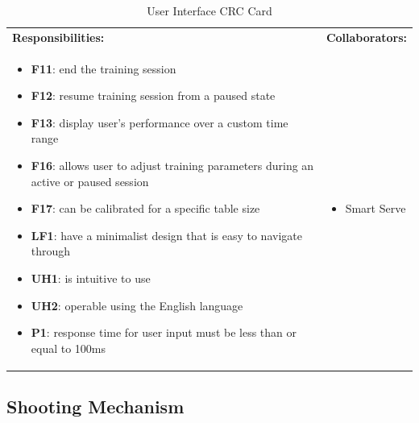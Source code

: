 \documentclass[11pt]{article}
\begin{document}
\begin{table}[H]
\centering
\label{my-label}
\begin{tabular}{ | >{\raggedright\arraybackslash}p{} | >{\raggedright\arraybackslash}p{} | }
\hline
\multicolumn{2}{|c|}{\textbf{Smart Serve}}             \\ \hline
\textbf{Responsibilities:} & \textbf{Collaborators:} \\ \hline
\begin{itemize}
\item \textbf{F11}: end the training session
\item \textbf{F12}: resume training session from a paused state
\item \textbf{F13}: display user's performance over a custom time range
\item \textbf{F16}: allows user to adjust training parameters during an active or paused session
\item \textbf{F17}: can be calibrated for a specific table size
\item \textbf{LF1}: have a minimalist design that is easy to navigate through
\item \textbf{UH1}: is intuitive to use
\item \textbf{UH2}: operable using the English language
\item \textbf{P1}: response time for user input must be less than or equal to 100ms
\end{itemize}
&
\begin{itemize}
\item Smart Serve
\end{itemize} \\ \hline
\end{tabular}
\caption{User Interface CRC Card}
\end{table}

\subsection{Shooting Mechanism}
\end{document}
